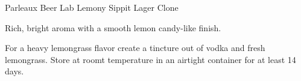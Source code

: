 \begin{recipe}{Parleaux Beer Lab Lemony Sippit Lager Clone} %

\begin{aboutblock}
Rich, bright aroma with a smooth lemon candy-like finish. \sourceaha
\end{aboutblock}


\begin{methodandtiming}
  
\begin{mashsteps}
\end{mashsteps}

\begin{fermentationsteps}
\end{fermentationsteps}

\begin{directions}
For a heavy lemongrass flavor create a tincture out of  vodka
and  fresh lemongrass. Store at roomt temperature in an
airtight container for at least 14 days.
\end{directions}

\end{methodandtiming}

\recipebreak

\begin{ingredientsblock}

\begin{malts}
\end{malts}

\begin{hops}
\end{hops}


\end{ingredientsblock}

\end{recipe}

